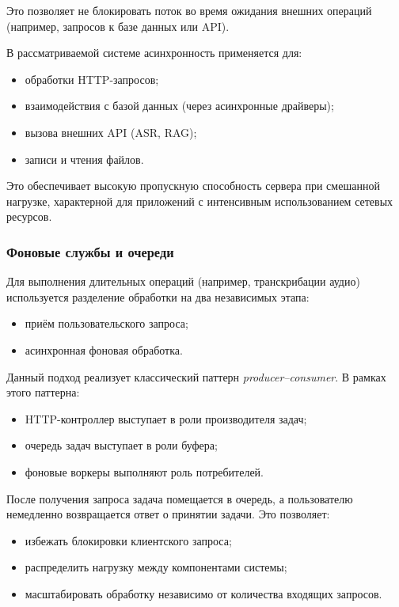 \documentclass{article}
\begin{document}
Это позволяет не блокировать поток во время ожидания внешних операций 
(например, запросов к базе данных или API).

В рассматриваемой системе асинхронность применяется для:
\begin{itemize}
\item обработки HTTP-запросов;
\item взаимодействия с базой данных (через асинхронные драйверы);
\item вызова внешних API (ASR, RAG);
\item записи и чтения файлов.
\end{itemize}

Это обеспечивает высокую пропускную способность сервера при смешанной нагрузке, характерной для приложений с интенсивным использованием сетевых ресурсов.

\subsubsection{Фоновые службы и очереди}

Для выполнения длительных операций (например, транскрибации аудио) используется разделение обработки на два независимых этапа:
\begin{itemize}
\item приём пользовательского запроса;
\item асинхронная фоновая обработка.
\end{itemize}

Данный подход реализует классический паттерн \emph{producer--consumer}. В рамках этого паттерна:
\begin{itemize}
\item HTTP-контроллер выступает в роли производителя задач;
\item очередь задач выступает в роли буфера;
\item фоновые воркеры выполняют роль потребителей.
\end{itemize}

После получения запроса задача помещается в очередь, а пользователю немедленно возвращается ответ о принятии задачи. Это позволяет:
\begin{itemize}
\item избежать блокировки клиентского запроса;
\item распределить нагрузку между компонентами системы;
\item масштабировать обработку независимо от количества входящих запросов.
\end{itemize}
\end{document}
